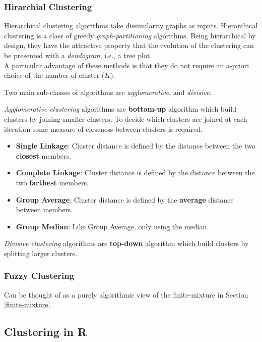 \documentclass[]{book}
\providecommand{\tightlist}{%
  \setlength{\itemsep}{0pt}\setlength{\parskip}{0pt}}
\theoremstyle{definition}
\theoremstyle{definition}
\theoremstyle{definition}
\theoremstyle{remark}
\begin{document}
\hypertarget{hirarchial-clustering}{%
\subsubsection{Hirarchial Clustering}\label{hirarchial-clustering}}

Hierarchical clustering algorithms take dissimilarity graphs as inputs.
Hierarchical clustering is a class of greedy \emph{graph-partitioning} algorithms.
Being hierarchical by design, they have the attractive property that the evolution of the clustering can be presented with a \emph{dendogram}, i.e., a tree plot.\\
A particular advantage of these methods is that they do not require an a-priori choice of the number of cluster (\(K\)).

Two main sub-classes of algorithms are \emph{agglomerative}, and \emph{divisive}.

\emph{Agglomerative clustering} algorithms are \textbf{bottom-up} algorithm which build clusters by joining smaller clusters.
To decide which clusters are joined at each iteration some measure of closeness between clusters is required.

\begin{itemize}
\tightlist
\item
  \textbf{Single Linkage}:
  Cluster distance is defined by the distance between the two \textbf{closest} members.
\item
  \textbf{Complete Linkage}:
  Cluster distance is defined by the distance between the two \textbf{farthest} members.
\item
  \textbf{Group Average}:
  Cluster distance is defined by the \textbf{average} distance between members.
\item
  \textbf{Group Median}:
  Like Group Average, only using the median.
\end{itemize}

\emph{Divisive clustering} algorithms are \textbf{top-down} algorithm which build clusters by splitting larger clusters.

\hypertarget{fuzzy-clustering}{%
\subsubsection{Fuzzy Clustering}\label{fuzzy-clustering}}

Can be thought of as a purely algorithmic view of the finite-mixture in Section \ref{finite-mixture}.

\hypertarget{clustering-in-r}{%
\subsection{Clustering in R}\label{clustering-in-r}}
\end{document}
